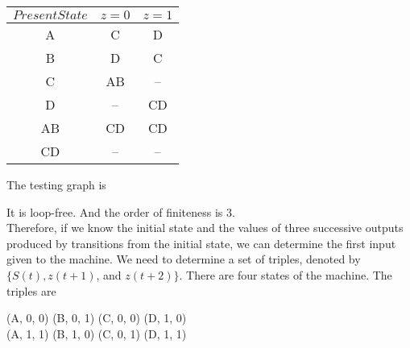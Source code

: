 \documentclass{article}
\begin{document}
  \vspace*{0.5cm}
    \begin{center}
\begin{tabular}{ccc}
 \hline

 \hline

 \hline

 \hline

 $Present State$ &  $z=0$ & $z=1$\\
\hline
A & C  &D \\
B & D  &C \\
C & AB & –\\
D & –  & CD \\
\hline
AB& CD & CD \\
CD& –  &–\\
 \hline

 \hline

 \hline

 \hline
\end{tabular}
\end{center}
\hspace*{0.5cm} The testing graph is\\
\begin{center}
\end{center}

\hspace*{0.5cm} It is loop-free. And the order of finiteness is 3.\\
\hspace*{0.5cm} Therefore, if we know the initial state and the values of three successive outputs produced by
transitions from the initial state, we can determine the first input given to the machine. We need
to determine a set of triples, denoted by $\{S(t), z(t + 1)$, and $z(t + 2)\}$. There are four states of the
machine. The triples are\\

\vspace*{0.4cm}
\begin{center}

  (A, 0, 0)  \hspace*{0.3cm}  (B, 0, 1)   \hspace*{0.3cm}   (C, 0, 0)    \hspace*{0.3cm}   (D, 1, 0)\\
  (A, 1, 1)  \hspace*{0.3cm}  (B, 1, 0)   \hspace*{0.3cm}   (C, 0, 1)    \hspace*{0.3cm}   (D, 1, 1)\\

\end{center}
\end{document}

